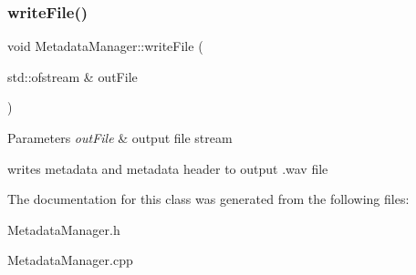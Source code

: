 \subsubsection{\texorpdfstring{write\+File()}{writeFile()}}
{\footnotesize\ttfamily void Metadata\+Manager\+::write\+File (\begin{DoxyParamCaption}\item[{std\+::ofstream \&}]{out\+File }\end{DoxyParamCaption})}


\begin{DoxyParams}{Parameters}
{\em out\+File} & output file stream\\
\hline
\end{DoxyParams}
writes metadata and metadata header to output .wav file 

The documentation for this class was generated from the following files\+:\begin{DoxyCompactItemize}
\item 
Metadata\+Manager.\+h\item 
Metadata\+Manager.\+cpp\end{DoxyCompactItemize}
